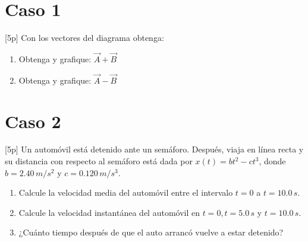 \documentclass{utea-tarea}
\begin{document}
\maketitle

\section*{Caso 1}
[5p] Con los vectores del diagrama obtenga:

\begin{enumerate}
    \item Obtenga y grafique: $\vec{A} + \vec{B}$
    \item Obtenga y grafique: $\vec{A} - \vec{B}$
\end{enumerate}



\section*{Caso 2}
[5p] Un automóvil está detenido ante un semáforo. Después, viaja en línea recta y su distancia con respecto al semáforo está dada por $x(t) = bt^2 - ct^3$, donde $b = 2.40 \, m/s^2$ y $c = 0.120 \, m/s^3$.

\begin{enumerate}
    \item Calcule la velocidad media del automóvil entre el intervalo $t = 0$ a $t = 10.0 \, s$.
    \item Calcule la velocidad instantánea del automóvil en $t = 0, t = 5.0 \, s$ y $t = 10.0 \, s$.
    \item  ¿Cuánto tiempo después de que el auto arrancó vuelve a estar detenido? \citep{Young2013}
\end{enumerate}
\end{document}
